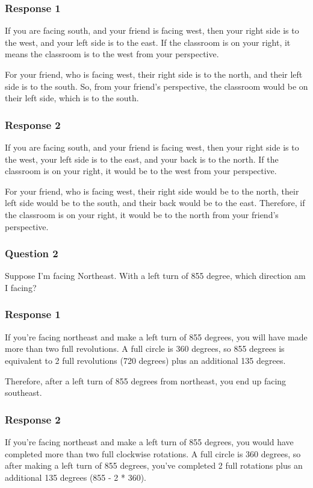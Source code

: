 \documentclass[12pt, a4paper]{article}
\begin{document}
\subsubsection*{Response 1}
If you are facing south, and your friend is facing west, then your right side is to the west, and your left side is to the east. If the classroom is on your right, it means the classroom is to the west from your perspective.

For your friend, who is facing west, their right side is to the north, and their left side is to the south. So, from your friend's perspective, the classroom would be on their left side, which is to the south.

\subsubsection*{Response 2}
If you are facing south, and your friend is facing west, then your right side is to the west, your left side is to the east, and your back is to the north. If the classroom is on your right, it would be to the west from your perspective.

For your friend, who is facing west, their right side would be to the north, their left side would be to the south, and their back would be to the east. Therefore, if the classroom is on your right, it would be to the north from your friend's perspective.

\subsubsection*{Question 2}
Suppose I'm facing Northeast. With a left turn of 855 degree, which direction am I facing?

\subsubsection*{Response 1}
If you're facing northeast and make a left turn of 855 degrees, you will have made more than two full revolutions. A full circle is 360 degrees, so 855 degrees is equivalent to 2 full revolutions (720 degrees) plus an additional 135 degrees.

Therefore, after a left turn of 855 degrees from northeast, you end up facing southeast.

\subsubsection*{Response 2}
If you're facing northeast and make a left turn of 855 degrees, you would have completed more than two full clockwise rotations. A full circle is 360 degrees, so after making a left turn of 855 degrees, you've completed 2 full rotations plus an additional 135 degrees (855 - 2 * 360).
\end{document}
